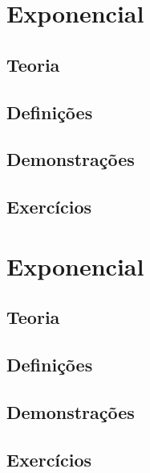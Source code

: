\documentclass[portuguese, 12pt, a4paper]{article}
\begin{document}
	\section{Exponencial}
	\subsection{Teoria}
	\subsection{Definições}
	\subsection{Demonstrações}
	\subsection{Exercícios}
	
	\section{Exponencial}
	\subsection{Teoria}
	\subsection{Definições}
	\subsection{Demonstrações}
	\subsection{Exercícios}
	
\end{document}
